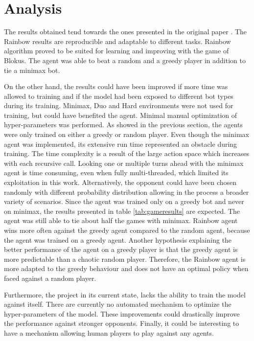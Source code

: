 \documentclass{article}
\begin{document}
\section{Analysis}
The results obtained tend towards the ones presented in the original paper \cite{rainbow}. The Rainbow results are reproducible and adaptable to different tasks. Rainbow algorithm proved to be suited for learning and improving with the game of Blokus. The agent was able to beat a random and a greedy player in addition to tie a minimax bot.

On the other hand, the results could have been improved if more time was allowed to training and if the model had been exposed to different bot types during its training. Minimax, Duo and Hard environments were not used for training, but could have benefited the agent. Minimal manual optimization of hyper-parameters was performed. As showed in the previous section, the agents were only trained on either a greedy or random player. Even though the minimax agent was implemented, its extensive run time represented an obstacle during training. The time complexity is a result of the large action space which increases with each recursive call. Looking one or multiple turns ahead with the minimax agent is time consuming, even when fully multi-threaded, which limited its exploitation in this work. Alternatively, the opponent could have been chosen randomly with different probability distribution allowing in the process a broader variety of scenarios. Since the agent was trained only on a greedy bot and never on minimax, the results presented in table \ref{tab:gameresults} are expected. The agent was still able to tie about half the games with minimax. Rainbow agent wins more often against the greedy agent compared to the random agent, because the agent was trained on a greedy agent. Another hypothesis explaining the better performance of the agent on a greedy player is that the greedy agent is more predictable than a chaotic random player. Therefore, the Rainbow agent is more adapted to the greedy behaviour and does not have an optimal policy when faced against a random player.
 
Furthermore, the project in its current state, lacks the ability to train the model against itself. There are currently no automated mechanism to optimize the hyper-parameters of the model. These improvements could drastically improve the performance against stronger opponents. Finally, it could be interesting to have a mechanism allowing human players to play against any agents.
\end{document}
